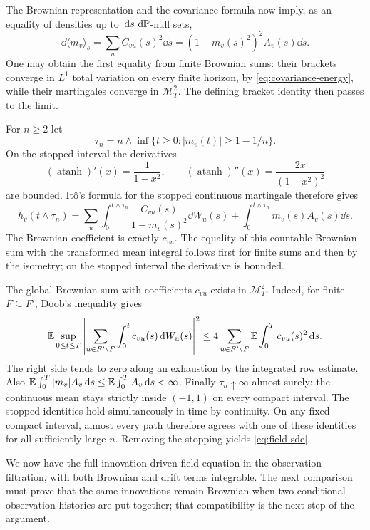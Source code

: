 The Brownian representation and the covariance formula now imply, as
an equality of densities up to $\,\mathrm d s\,\,\mathrm d\mathbb P$-null sets,
\[
 \dd\langle m_v\rangle_s
    =\sum_u C_{vu}(s)^2\dd s
    =(1-m_v(s)^2)^2 A_v(s)\dd s.
\]
One may obtain the first equality from finite Brownian sums: their
brackets converge in $L^1$ total variation on every finite horizon,
by \eqref{eq:covariance-energy}, while their martingales converge in
$\mathcal M_T^2$.  The defining bracket identity then passes to the
limit.

For $n\ge2$ let
\[
 \tau_n=n\wedge\inf\{t\ge0:|m_v(t)|\ge1-1/n\}.
\]
On the stopped interval the derivatives
\[
 (\operatorname{atanh})'(x)=\frac1{1-x^2},\qquad
 (\operatorname{atanh})''(x)=\frac{2x}{(1-x^2)^2}
\]
are bounded.  It\^o's formula for the stopped continuous martingale
therefore gives
\[
 h_v(t\wedge\tau_n)
   =\sum_u\int_0^{t\wedge\tau_n}
             \frac{C_{vu}(s)}{1-m_v(s)^2}\dd W_u(s)
       +\int_0^{t\wedge\tau_n}m_v(s)A_v(s)\dd s.
\]
The Brownian coefficient is exactly $c_{vu}$.  The equality of this
countable Brownian sum with the transformed mean integral follows
first for finite sums and then by the isometry; on the stopped
interval the derivative is bounded.

The global Brownian sum with coefficients $c_{vu}$ exists in
$\mathcal M_T^2$.  Indeed, for finite $F\subseteq F'$, Doob's inequality
gives
\[
 \mathbb E\sup_{0\le t\le T}
 \left|\sum_{u\in F'\setminus F}\int_0^t c_{vu}(s)\,\mathrm d W_u(s)\right|^2
 \le4\sum_{u\in F'\setminus F}\mathbb E\int_0^T c_{vu}(s)^2\,\mathrm d s.
\]
The right side tends to zero along an exhaustion by the integrated
row estimate.  Also
$\mathbb E\int_0^T|m_v|A_v\,\mathrm d s\le\mathbb E\int_0^T A_v\,\mathrm d s<\infty$.
Finally $\tau_n\uparrow\infty$ almost surely: the continuous mean stays
strictly inside $(-1,1)$ on every compact interval.  The stopped
identities hold simultaneously in time by continuity.  On any fixed
compact interval, almost every path therefore agrees with one of
these identities for all sufficiently large $n$.  Removing the
stopping yields \eqref{eq:field-sde}.

We now have the full innovation-driven field equation in the observation
filtration, with both Brownian and drift terms integrable.  The next
comparison must prove that the same innovations remain Brownian when
two conditional observation histories are put together; that
compatibility is the next step of the argument.

